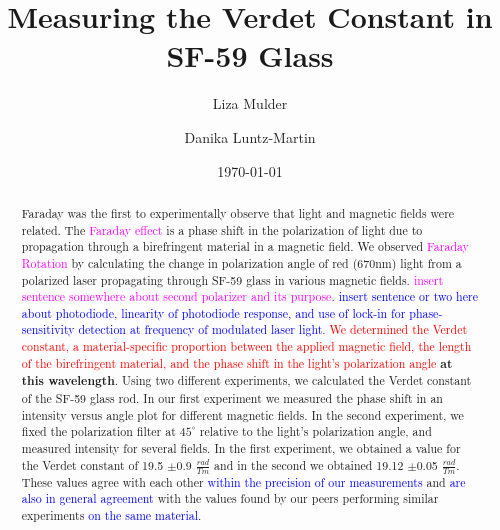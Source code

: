 \documentclass[prb,preprint]{revtex4-1}
\begin{document}

\title{Measuring the Verdet Constant in SF-59 Glass}


\author{Liza Mulder}


\author{Danika Luntz-Martin}


\date{\today}



\begin{abstract}

Faraday was the first to experimentally observe that light and magnetic fields were related. The \textcolor{magenta}{Faraday effect} is a phase shift in the polarization of light due to propagation through a birefringent material in a magnetic field. We observed \textcolor{magenta}{Faraday Rotation} by calculating the change in polarization angle of red (670nm) light from a polarized laser propagating through SF-59 glass in various magnetic fields. \textcolor{magenta}{insert sentence somewhere about second polarizer and its purpose}. \textcolor{blue}{insert sentence or two here about photodiode, linearity of photodiode response, and use of lock-in for phase-sensitivity detection at frequency of modulated laser light}. \textcolor{red}{ We determined the Verdet constant, a material-specific proportion between the applied magnetic field, the length of the birefringent material, and the phase shift in the light's polarization angle } \textbf{at this wavelength}. Using two different experiments, we calculated the Verdet constant of the SF-59 glass rod. In our first experiment we measured the phase shift in an intensity versus angle plot for different magnetic fields.  In the second experiment, we fixed the polarization filter at $45^{\circ}$ relative to the light's polarization angle, and measured intensity for several fields. In the first experiment, we obtained a value for the Verdet constant of 19.5 $\pm$0.9 $\frac{rad}{Tm}$ and in the second we obtained 19.12 $\pm$0.05 $\frac{rad}{Tm}$. These values agree with each other \textcolor{blue}{within the precision of our measurements} and \textcolor{blue}{are also in general agreement} with the values found by our peers performing similar experiments \textcolor{blue}{on the same material}. 


\end{abstract}
\end{document}
